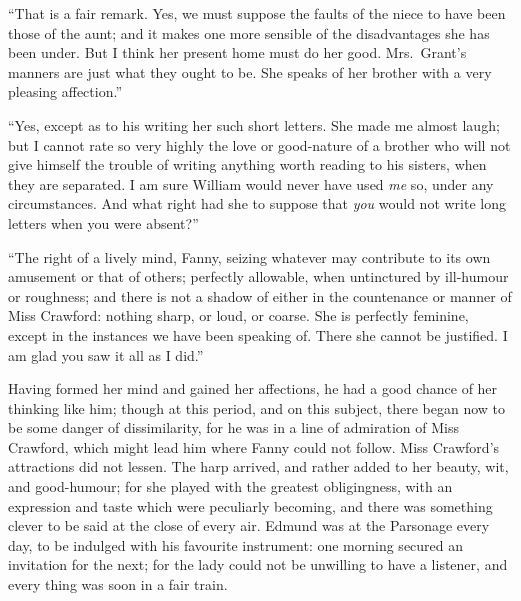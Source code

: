 \documentclass{article}
\begin{document}
``That is a fair remark.  Yes, we must suppose the faults
of the niece to have been those of the aunt; and it makes
one more sensible of the disadvantages she has been under.
But I think her present home must do her good.
Mrs.\ Grant's manners are just what they ought to be.
She speaks of her brother with a very pleasing affection.''

``Yes, except as to his writing her such short letters.
She made me almost laugh; but I cannot rate so very highly
the love or good-nature of a brother who will not give
himself the trouble of writing anything worth reading
to his sisters, when they are separated.  I am sure William
would never have used \emph{me} so, under any circumstances.
And what right had she to suppose that \emph{you} would not write
long letters when you were absent?''

``The right of a lively mind, Fanny, seizing whatever
may contribute to its own amusement or that of others;
perfectly allowable, when untinctured by ill-humour
or roughness; and there is not a shadow of either in the
countenance or manner of Miss Crawford:  nothing sharp,
or loud, or coarse.  She is perfectly feminine, except in
the instances we have been speaking of.  There she cannot
be justified.  I am glad you saw it all as I did.''

Having formed her mind and gained her affections, he had a
good chance of her thinking like him; though at this period,
and on this subject, there began now to be some danger
of dissimilarity, for he was in a line of admiration
of Miss Crawford, which might lead him where Fanny could
not follow.  Miss Crawford's attractions did not lessen.
The harp arrived, and rather added to her beauty, wit,
and good-humour; for she played with the greatest obligingness,
with an expression and taste which were peculiarly becoming,
and there was something clever to be said at the close
of every air.  Edmund was at the Parsonage every day,
to be indulged with his favourite instrument:
one morning secured an invitation for the next;
for the lady could not be unwilling to have a listener,
and every thing was soon in a fair train.
\end{document}
